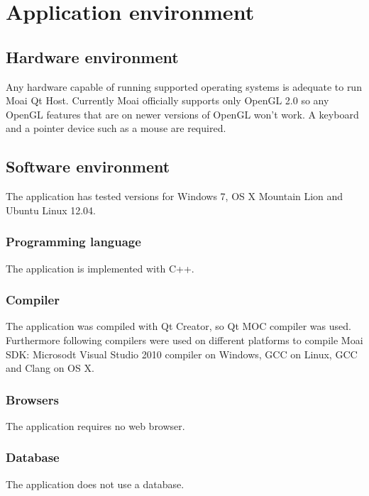 \chapter{Application environment}
\label{chap:using}

\section{Hardware environment}

Any hardware capable of running supported operating systems is adequate to run Moai Qt Host. Currently Moai officially supports only OpenGL 2.0 so any OpenGL features that are on newer versions of OpenGL won't work. A keyboard and a pointer device such as a mouse are required.

\section{Software environment}

The application has tested versions for Windows 7, OS X Mountain Lion and Ubuntu Linux 12.04.

\subsection{Programming language}

The application is implemented with C++.

\subsection{Compiler}

The application was compiled with Qt Creator, so Qt MOC compiler was used. Furthermore following compilers were used on different platforms to compile Moai SDK: Microsodt Visual Studio 2010 compiler on Windows, GCC on Linux, GCC and Clang on OS X.

\subsection{Browsers}

The application requires no web browser.

\subsection{Database}

The application does not use a database.


